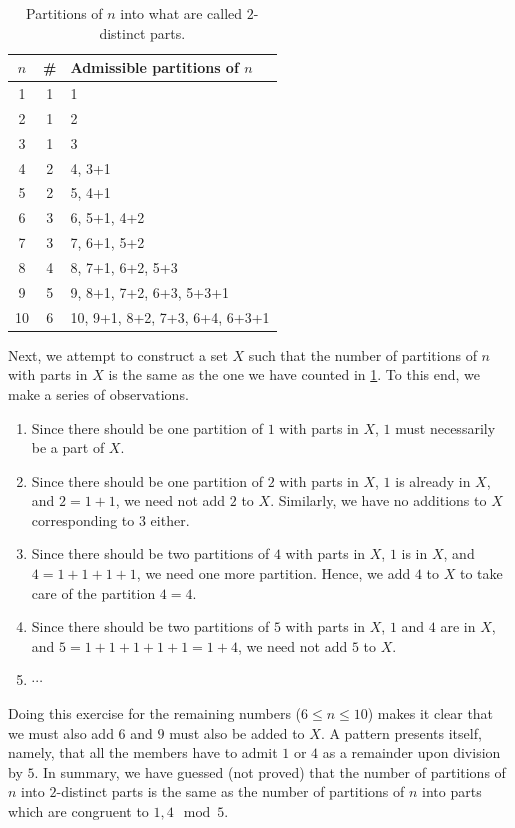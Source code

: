 \begin{table}[H]
\centering
\begin{tabular}{|c|c|l|}
\hline
$n$ & \# & Admissible partitions of $n$ \\
\hline
1 & 1 & 1 \\
2 & 1 & 2 \\
3 & 1 & 3 \\
4 & 2 & 4, 3+1 \\
5 & 2 & 5, 4+1 \\
6 & 3 & 6, 5+1, 4+2 \\
7 & 3 & 7, 6+1, 5+2 \\
8 & 4 & 8, 7+1, 6+2, 5+3 \\
9 & 5 & 9, 8+1, 7+2, 6+3, 5+3+1 \\
10 & 6 & 10, 9+1, 8+2, 7+3, 6+4, 6+3+1 \\
\hline
\end{tabular}
\caption{Partitions of $n$ into what are called $2$-distinct parts.}
\label{table:1}
\end{table}
\raggedbottom
Next, we attempt to construct a set $X$ such that the number of partitions of $n$ with parts in $X$ is the same as the one we have counted in \cref{table:1}. To this end, we make a series of observations.
\begin{enumerate}
    \item Since there should be one partition of $1$ with parts in $X$, $1$ must necessarily be a part of $X$.
    \item Since there should be one partition of $2$ with parts in $X$, $1$ is already in $X$, and $2=1+1$, we need not add $2$ to $X$. Similarly, we have no additions to $X$ corresponding to $3$ either.
    \item Since there should be two partitions of $4$ with parts in $X$, $1$ is in $X$, and $4=1+1+1+1$, we need one more partition. Hence, we add $4$ to $X$ to take care of the partition $4=4$. 
    \item Since there should be two partitions of $5$ with parts in $X$, $1$ and $4$ are in $X$, and $5=1+1+1+1+1=1+4$, we need not add $5$ to $X$.
    \item $\cdots$
\end{enumerate}
Doing this exercise for the remaining numbers ($6\leq n\leq 10$) makes it clear that we must also add $6$ and $9$ must also be added to $X$. A pattern presents itself, namely, that all the members have to admit $1$ or $4$ as a remainder upon division by $5$. In summary, we have guessed (not proved) that the number of partitions of $n$ into $2$-distinct parts is the same as the number of partitions of $n$ into parts which are congruent to $1,4\mod{5}$.  

